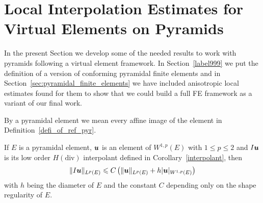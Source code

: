 \section{Local Interpolation Estimates for Virtual Elements on Pyramids}
In the present Section we develop some of the needed results to work
with pyramids following a virtual element framework. In Section~\ref{label999} we 
put the definition of a version of conforming pyramidal finite elements and 
in Section~\ref{sec:pyramidal_finite_elements}
we have included anisotropic local estimates found  for them to show that we could
build a full FE framework as a variant of our final work.  

By a pyramidal element we mean every affine image of the element in
Definition~\ref{defi_of_ref_pyr}.
\begin{lemma}\label{auxlabel6}
If $E$ is a pyramidal element, $\boldsymbol{u}$ is an element of $W^{1,p}(E)$ with 
$1\leqslant p\leqslant 2$
and $I\boldsymbol{u}$ is its low order $H(\text{div})$ interpolant defined in Corollary~\ref{interpolant},
then
\begin{equation}\label{estab2}
\|I\boldsymbol{u}\|_{L^p(E)}\leqslant C\left(\|\boldsymbol{u}\|_{L^p(E)}+ h|\boldsymbol{u}|_{W^{1,p}(E)}\right)
\end{equation}
with $h$ being the diameter of $E$ and the constant $C$ depending only on the shape regularity of $E$.
\end{lemma}
